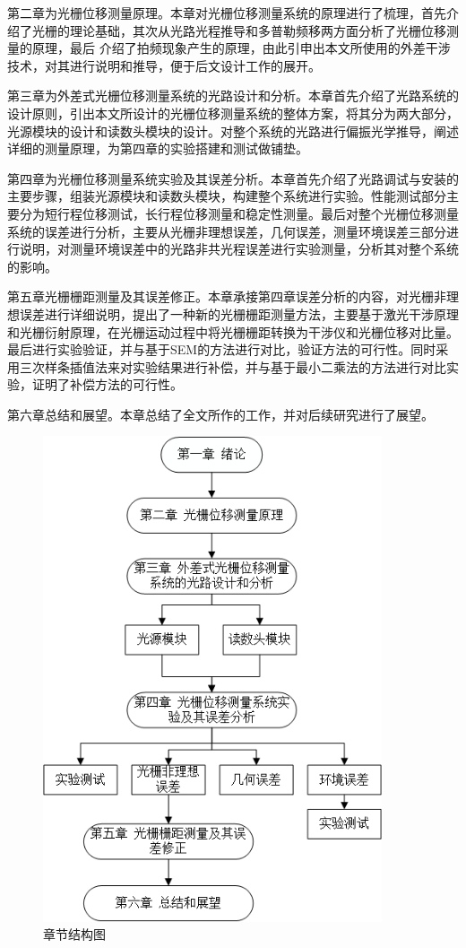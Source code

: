 \documentclass[type=master,oneside]{fduthesis}
\begin{document}
第二章为光栅位移测量原理。本章对光栅位移测量系统的原理进行了梳理，首先介绍了光栅的理论基础，其次从光路光程推导和多普勒频移两方面分析了光栅位移测量的原理，最后
介绍了拍频现象产生的原理，由此引申出本文所使用的外差干涉技术，对其进行说明和推导，便于后文设计工作的展开。

第三章为外差式光栅位移测量系统的光路设计和分析。本章首先介绍了光路系统的设计原则，引出本文所设计的光栅位移测量系统的整体方案，将其分为两大部分，光源模块的设计和读数头模块的设计。对整个系统的光路进行偏振光学推导，阐述详细的测量原理，为第四章的实验搭建和测试做铺垫。

第四章为光栅位移测量系统实验及其误差分析。本章首先介绍了光路调试与安装的主要步骤，组装光源模块和读数头模块，构建整个系统进行实验。性能测试部分主要分为短行程位移测试，长行程位移测量和稳定性测量。最后对整个光栅位移测量系统的误差进行分析，主要从光栅非理想误差，几何误差，测量环境误差三部分进行说明，对测量环境误差中的光路非共光程误差进行实验测量，分析其对整个系统的影响。

第五章光栅栅距测量及其误差修正。本章承接第四章误差分析的内容，对光栅非理想误差进行详细说明，提出了一种新的光栅栅距测量方法，主要基于激光干涉原理和光栅衍射原理，在光栅运动过程中将光栅栅距转换为干涉仪和光栅位移对比量。最后进行实验验证，并与基于SEM的方法进行对比，验证方法的可行性。同时采用三次样条插值法来对实验结果进行补偿，并与基于最小二乘法的方法进行对比实验，证明了补偿方法的可行性。

第六章总结和展望。本章总结了全文所作的工作，并对后续研究进行了展望。

\begin{figure}[H]
  \centering
  \includegraphics[width=10cm]{1-fig/章节结构图.png}
  \caption{章节结构图}
  \label{fig:章节结构图}
\end{figure}
\end{document}
